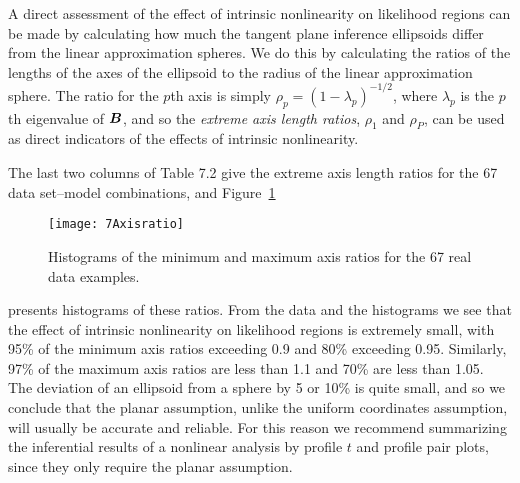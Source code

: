 A direct assessment of the effect of intrinsic nonlinearity on
likelihood regions can be made by calculating how much
the tangent plane inference ellipsoids differ from the
linear approximation spheres.
We do this by calculating the ratios of the lengths of the axes
of the ellipsoid to the radius of the linear approximation sphere.
The ratio for the $p $th axis is simply
$ \rho_p = ( 1 - \lambda_p )^{-{1/2}}$, where
$\lambda_p $ is the $p $th eigenvalue of ${\boldsymbol B}$, and so
the {\em extreme axis length ratios}, $\rho_{1}$
and $\rho_{P}$, can be used as direct indicators of the
effects of intrinsic nonlinearity.

The last two columns of Table 7.2 give
the extreme axis length ratios for the 67 data set--model
combinations, and Figure~\ref{fig:Axisratio}
\begin{figure}
  \centerline{\texttt{[image: 7Axisratio]}}%
  \caption{\label{fig:Axisratio}
  Histograms of the minimum and maximum axis ratios for the 67 real
  data examples.  }
\end{figure}
presents histograms of these ratios.
From the data and the histograms
we see that the effect of intrinsic nonlinearity on
likelihood regions is extremely small,
with 95\% of the minimum axis ratios exceeding 0.9 and 80\%
exceeding 0.95.
Similarly, 97\% of the maximum axis
ratios are less than 1.1 and 70\% are less than 1.05.
The deviation of an ellipsoid from a sphere by 5 or 10\%
is quite small, and so we conclude that the planar assumption,
unlike the uniform coordinates assumption, will usually be
accurate and reliable.
For this reason we recommend summarizing the inferential results
of a nonlinear analysis by profile $t$ and profile pair plots,
since they only require the planar assumption.


